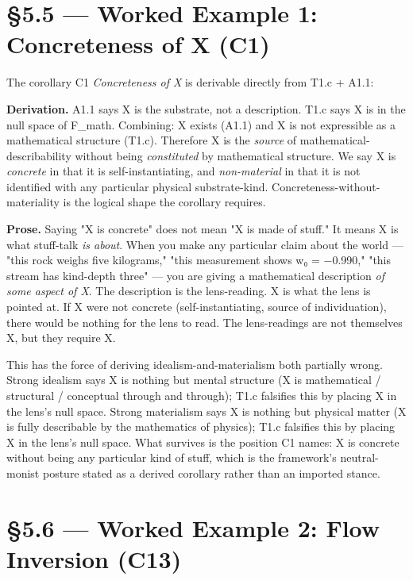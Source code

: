 \documentclass[11pt, openany]{book}
\newcommand{\sectionbreak}{\clearpage}
\begin{document}
\sectionbreak

\section{§5.5 --- Worked Example 1: Concreteness of X (C1)}

The corollary C1 \textit{Concreteness of X} is derivable directly from T1.c + A1.1:

\textbf{Derivation.} A1.1 says X is the substrate, not a description. T1.c says X is in the null space of F\_\allowbreak{}math. Combining: X exists (A1.1) and X is not expressible as a mathematical structure (T1.c). Therefore X is the \textit{source} of mathematical-describability without being \textit{constituted} by mathematical structure. We say X is \textit{concrete} in that it is self-instantiating, and \textit{non-material} in that it is not identified with any particular physical substrate-kind. Concreteness-without-materiality is the logical shape the corollary requires.

\textbf{Prose.} Saying "X is concrete" does not mean "X is made of stuff." It means X is what stuff-talk \textit{is about}. When you make any particular claim about the world --- "this rock weighs five kilograms," "this measurement shows w₀ = −0.990," "this stream has kind-depth three" --- you are giving a mathematical description \textit{of some aspect of X}. The description is the lens-reading. X is what the lens is pointed at. If X were not concrete (self-instantiating, source of individuation), there would be nothing for the lens to read. The lens-readings are not themselves X, but they require X.

This has the force of deriving idealism-and-materialism both partially wrong. Strong idealism says X is nothing but mental structure (X is mathematical / structural / conceptual through and through); T1.c falsifies this by placing X in the lens's null space. Strong materialism says X is nothing but physical matter (X is fully describable by the mathematics of physics); T1.c falsifies this by placing X in the lens's null space. What survives is the position C1 names: X is concrete without being any particular kind of stuff, which is the framework's neutral-monist posture stated as a derived corollary rather than an imported stance.

\sectionbreak

\section{§5.6 --- Worked Example 2: Flow Inversion (C13)}
\end{document}
